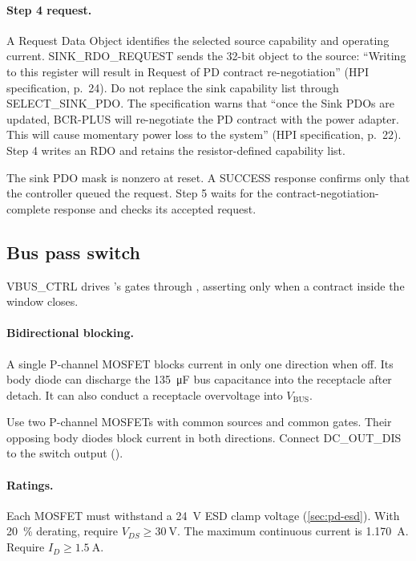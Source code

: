 \paragraph{Step 4 request.} A Request Data Object identifies the selected
source capability and operating current. SINK\_RDO\_REQUEST sends the 32-bit
object to the source: ``Writing to this
register will result in Request of PD contract re-negotiation'' (HPI
specification, p.~24). Do not replace the sink capability list through
SELECT\_SINK\_PDO. The specification warns that ``once the Sink PDOs are
updated, BCR-PLUS will re-negotiate the PD
contract with the power adapter. This will cause momentary power loss to the
system'' (HPI specification, p.~22). Step 4 writes an RDO and retains the
resistor-defined capability list.

The sink PDO mask is nonzero at reset. A SUCCESS response confirms only that
the controller queued the request. Step 5 waits for the
contract-negotiation-complete response and checks its accepted request.

\subsection{Bus pass switch}\label{sec:pd-fet}

VBUS\_CTRL drives 's gates through , asserting only when
a contract inside the window closes.

\paragraph{Bidirectional blocking.} A single P-channel MOSFET blocks current in
only one direction when off. Its body diode can discharge the
\SI{135}{\micro\farad} bus capacitance into the receptacle after detach. It can
also conduct a receptacle overvoltage into $V_{\mathrm{BUS}}$.

Use two P-channel MOSFETs with common sources and common gates. Their opposing
body diodes block current in both directions. Connect DC\_OUT\_DIS to the
switch output ().

\paragraph{Ratings.} Each MOSFET must withstand a \SI{24}{\volt} ESD clamp
voltage (\cref{sec:pd-esd}). With \SI{20}{\percent} derating, require
$V_{DS}\geq\SI{30}{\volt}$. The maximum continuous current is
\SI{1.170}{\ampere}. Require $I_D\geq\SI{1.5}{\ampere}$.

